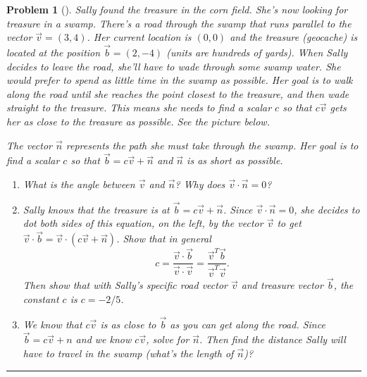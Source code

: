 \documentclass[letterpaper,oneside]{book}%
\theoremstyle{plain}
\theoremstyle{box}
\theoremstyle{problem}
\newtheorem{problemnum}{Problem}[chapter]
\newenvironment{problem}[1][]{\begin{problemnum}[#1]}{\end{problemnum}\nopagebreak\hrule\bigskip}
\begin{document}
\begin{problem}
 Sally found the treasure in the corn field.  She's now looking for treasure in a swamp. There's a road through the swamp that runs parallel to the vector $\vec v=(3,4)$. Her current location is $(0,0)$ and the treasure (geocache) is located at the position $\vec b=(2,-4)$ (units are hundreds of yards). When Sally decides to leave the road, she'll have to wade through some swamp water. She would prefer to spend as little time in the swamp as possible. Her goal is to walk along the road until she reaches the point closest to the treasure, and then wade straight to the treasure.  This means she needs to find a scalar $c$ so that $c\vec v$ gets her as close to the treasure as possible. See the picture below. 
\begin{center}	
\quad 
{}
\end{center}
The vector $\vec n$ represents the path she must take through the swamp. Her goal is to find a scalar $c$ so that $\vec b=c\vec v+\vec n$ and $\vec n$ is as short as possible. 
\begin{enumerate}
 \item What is the angle between $\vec v$ and $\vec n$? Why does $\vec v\cdot \vec n=0$?
 \item Sally knows that the treasure is at $\vec b = c\vec v+\vec n$.  Since $\vec v\cdot \vec n = 0$, she decides to dot both sides of this equation, on the left, by the vector $\vec v$ to get $\vec v\cdot \vec b = \vec v\cdot (c\vec v+\vec n)$. Show that in general $$c = \dfrac{\vec v\cdot \vec b}{\vec v\cdot \vec v} = \dfrac{\vec v^T\vec b}{\vec v^T\vec v}.$$ Then show that with Sally's specific road vector $\vec v$ and treasure vector $\vec b$, the constant $c$ is $c=-2/5$. 
 \item We know that $c\vec v$ is as close to $\vec b$ as you can get along the road. Since $\vec b = c\vec v+n$ and we know $c\vec v$, solve for $\vec n$. Then find the distance Sally will have to travel in the swamp (what's the length of $\vec n$)? 
\end{enumerate}
 \end{problem}
 
\end{document}
